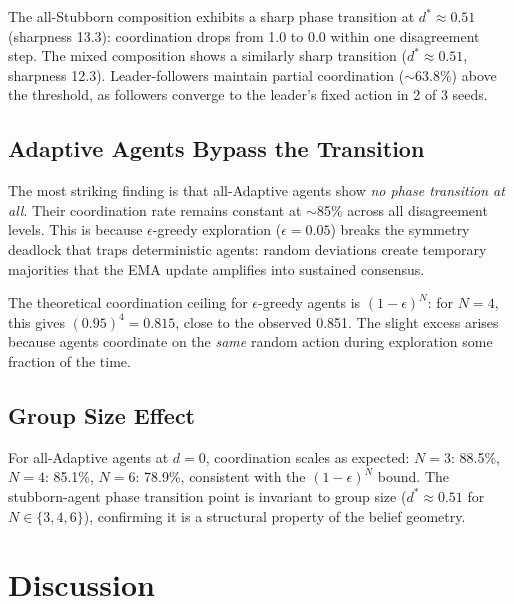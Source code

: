 \documentclass[11pt]{article}
\begin{document}
The all-Stubborn composition exhibits a sharp phase transition at $d^* \approx 0.51$ (sharpness 13.3): coordination drops from 1.0 to 0.0 within one disagreement step.
The mixed composition shows a similarly sharp transition ($d^* \approx 0.51$, sharpness 12.3).
Leader-followers maintain partial coordination ($\sim$63.8\%) above the threshold, as followers converge to the leader's fixed action in 2 of 3 seeds.

\subsection{Adaptive Agents Bypass the Transition}

The most striking finding is that all-Adaptive agents show \emph{no phase transition at all}.
Their coordination rate remains constant at $\sim$85\% across all disagreement levels.
This is because $\epsilon$-greedy exploration ($\epsilon = 0.05$) breaks the symmetry deadlock that traps deterministic agents: random deviations create temporary majorities that the EMA update amplifies into sustained consensus.

The theoretical coordination ceiling for $\epsilon$-greedy agents is $(1 - \epsilon)^N$: for $N = 4$, this gives $(0.95)^4 = 0.815$, close to the observed 0.851.
The slight excess arises because agents coordinate on the \emph{same} random action during exploration some fraction of the time.

\subsection{Group Size Effect}

For all-Adaptive agents at $d = 0$, coordination scales as expected:
$N = 3$: 88.5\%, $N = 4$: 85.1\%, $N = 6$: 78.9\%, consistent with the $(1 - \epsilon)^N$ bound.
The stubborn-agent phase transition point is invariant to group size ($d^* \approx 0.51$ for $N \in \{3, 4, 6\}$), confirming it is a structural property of the belief geometry.

\section{Discussion}
\end{document}

